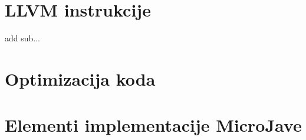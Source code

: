 \section{LLVM instrukcije}

add sub...

\section{Optimizacija koda}




\section{Elementi implementacije MicroJave}

